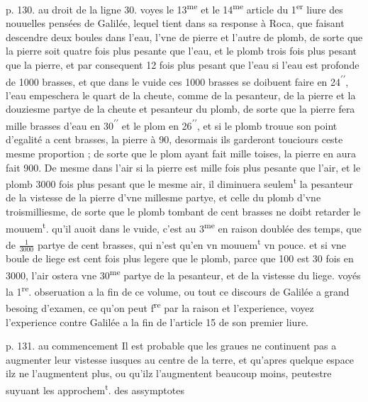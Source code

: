 \documentclass[11pt,a4paper]{article}
\begin{document}
p. 130. au droit de la ligne 30.
voyes le 13\textsuperscript{me} et le 14\textsuperscript{me} article du 1\textsuperscript{er} liure des nouuelles pensées de Galilée, lequel tient dans sa response à Roca, que faisant descendre deux boules dans l'eau, l'vne de pierre et l'autre de plomb, de sorte que la pierre soit quatre fois plus pesante que l'eau, et le plomb trois fois plus pesant que la pierre, et par consequent 12 fois plus pesant que l'eau si l'eau est profonde de 1000 brasses, et que dans le vuide ces 1000 brasses se doibuent faire en 24\textsuperscript{$\prime\prime$}, l'eau empeschera le quart de la cheute, comme de la pesanteur, de la pierre et la douziesme partye de la cheute et pesanteur du plomb, de sorte que la pierre fera mille brasses d'eau en 30\textsuperscript{$\prime\prime$} et le plom en 26\textsuperscript{$\prime\prime$}, et si le plomb trouue son point d'egalité a cent brasses, la pierre à 90, desormais ils garderont touciours ceste mesme proportion ; de sorte que le plom ayant fait mille toises, la pierre en aura fait 900. De mesme dans l'air si la pierre est mille fois plus pesante que l'air, et le plomb 3000 fois plus pesant que le mesme air, il diminuera seulem\textsuperscript{t} la pesanteur de la vistesse de la pierre d'vne millesme partye, et celle du plomb d'vne troismilliesme, de sorte que le plomb tombant de cent brasses ne doibt retarder le mouuem\textsuperscript{t}. qu'il auoit dans le \struck{\ill{}} vuide, c'est au 3\textsuperscript{me} en raison doublée des temps, que de $\frac{1}{3000}$ partye de cent brasses, qui n'est qu'en vn mouuem\textsuperscript{t} vn pouce. et si vne boule de liege est cent fois plus legere que le plomb, parce que 100 est 30 fois en 3000, l'air ostera vne 30\textsuperscript{me} partye de la pesanteur, et de la vistesse du liege. voyés la 1\textsuperscript{re}. obseruation a la fin de ce volume, ou tout ce discours de Galilée a grand besoing d'examen, ce qu'on peut f\textsuperscript{re} par la raison et l'experience, voyez l'experience contre Galilée a la fin de l'article 15 de son premier liure.

p. 131. au commencement
Il est probable que les graues ne continuent pas a augmenter leur vistesse iusques au centre de la terre, et qu'apres quelque espace ilz ne l'augmentent plus, ou qu'ilz l'augmentent beaucoup moins, peutestre suyuant les approchem\textsuperscript{t}. des assymptotes
\end{document}
